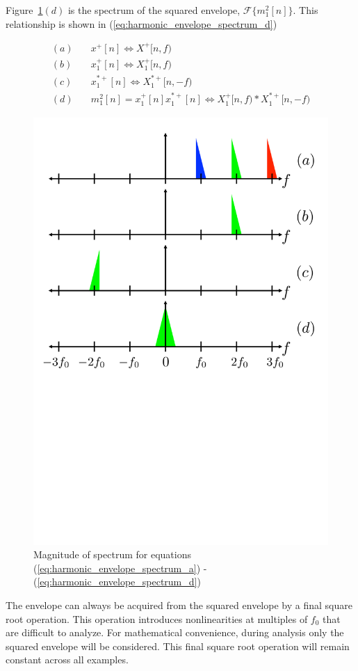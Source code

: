 \documentclass [11pt, proquest,oneside] {ganter_thesis}[2015/03/03]
\begin{document}
Figure~\ref{fig:harmonic_envelope}$(d)$ is the spectrum of the squared envelope, $\mathcal{F}\Big\{ m^2_1[n] \Big\}$.  This relationship is shown in (\ref{eq:harmonic_envelope_spectrum_d})

\begin{align}
\label{eq:harmonic_envelope_spectrum_a}
(a)& \quad x^+[n] \Longleftrightarrow X^+[n,f)  \\
(b)& \quad x^+_1[n] \Longleftrightarrow X^+_1[n,f) \\
(c)& \quad x^{*+}_1[n] \Longleftrightarrow X^{*+}_1[n,-f) \\
\label{eq:harmonic_envelope_spectrum_d}
(d)& \quad m_1^2[n] = x^+_1[n] x^{*+}_1[n] \Longleftrightarrow X^+_1[n,f) * X^{*+}_1[n,-f)
\end{align}

\begin{figure}[!ht]
  \centering
    \includegraphics[width=.62\textwidth]{harmonic_envelope}
        \caption{Magnitude of spectrum for equations (\ref{eq:harmonic_envelope_spectrum_a}) - (\ref{eq:harmonic_envelope_spectrum_d})}\label{fig:harmonic_envelope}
\end{figure}

The envelope can always be acquired from the squared envelope by a final square root operation.  This operation introduces nonlinearities at multiples of $f_0$ that are difficult to analyze.  For mathematical convenience, during analysis only the squared envelope will be considered.  This final square root operation will remain constant across all examples.
\end{document}
